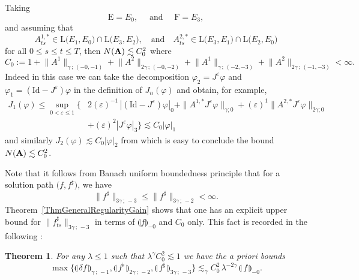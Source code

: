 \documentclass[11pt,a4paper]{amsart}
\renewcommand{\leq}{\leqslant}
\newcommand{\ssk}{\smallskip}
\newtheorem{thm}{\hspace{-0.15cm}  {\sc Theorem} } %
\numberwithin{equation}{section} %
\begin{document}
Taking
$$
\textrm{E} = E_0, \quad \textrm{ and }\quad \textrm{F} = E_3,
$$ 
and assuming that 
$$
A^{1,*}_{ts} \in \textrm{L}\big(E_1,E_0\big) \cap \textrm{L}\big(E_3,E_2\big)
,\quad
\text{and}\quad 
A^{2,*}_{ts} \in \textrm{L}\big(E_3 , E_1\big) \cap \textrm{L}\big(E_2,E_0\big)
$$ 
for all $0\leq s\leq t\leq T$, then 
$
N({\bf A}) \lesssim C_0^2
$ 
where
\begin{equation}
\label{EqDefnC0}
C_0 := 1+\big\|A^1\big\|_{\gamma\,;\,(-0,-1)}  + \big\|A^2\big\|_{2\gamma\,;\,(-0,-2)} +  \big\|A^1\big\|_{\gamma\,;\,(-2,-3)}  + \big\|A^2\big\|_{2\gamma\,;\,(-1,-3)}  < \infty .
\end{equation}
Indeed in this case we can take the decomposition $\varphi_2 = J^\varepsilon \varphi$ and $\varphi_1 = (\mathrm{Id} - J^\varepsilon) \varphi$ in the definition of $J_n(\varphi)$ and obtain, for example,
 \begin{equation*}
\begin{split}
J_1(\varphi) \leq
\sup_{0 < \varepsilon \leq 1} \Big\{&   2
 ( \varepsilon)^{-1} \, | (\mathrm{Id} - J^\varepsilon) \varphi|_0
  +   \| A^{1,*}J^\varepsilon \varphi\|_{\gamma;0}  
 + ( \varepsilon)^{1}\|A^{2,*} J^\varepsilon \varphi\|_{2\gamma;0} 
 \\ &
  +  ( \varepsilon)^{2}|J^\varepsilon \varphi|_3 
  \Big\} \lesssim  C_0 |\varphi|_1
\end{split}
\end{equation*}
and similarly $J_2(\varphi) \lesssim C_0 |\varphi|_2$ from which is easy to conclude the bound $N({\bf A}) \lesssim C_0^2$.


\ssk

Note that it follows from Banach uniform boundedness principle that for a solution path $\big(f,f^\sharp\big)$, we have
$$
\big\| f^\sharp\big\|_{3\gamma\,;\,-3} \leq \big\| f^\sharp\big\|_{3\gamma\,;\,-2} < \infty.
$$
Theorem~\ref{ThmGeneralRegularityGain} shows that one has an explicit upper bound for $\big\| f^\sharp_{ts}\big\|_{3\gamma\,;\,-3}$ in terms of $ \llparenthesis f\rrparenthesis_{-0}$ and $C_0$ only. This fact is recorded in the following :

\begin{thm}
\label{ThmRegularityGain} 
For any $\lambda \leq 1$ such that $\lambda^\gamma C_0^2 \lesssim 1$ we have the a priori bounds
\begin{equation}
\label{EqFundamentalAPrioriEstimate}
\max\Big\{  \llparenthesis\, \delta f \,\rrparenthesis_{\gamma\,;\, - 1} , \llparenthesis\, f^\flat \,\rrparenthesis_{2 \gamma\,;\, - 2}, \llparenthesis\, f^\sharp \,\rrparenthesis_{3 \gamma\,;\, - 3} \Big\} \lesssim_{\gamma} C_0^2\,\lambda^{-2\gamma}\,\llparenthesis\, f\,\rrparenthesis_{-0} .
\end{equation}
\end{thm}
\end{document}
